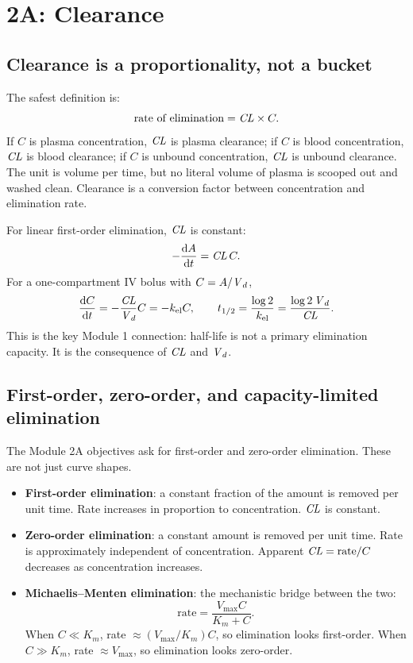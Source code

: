 \documentclass[a4paper]{article}
\newcommand{\CL}{\ensuremath{\pksym{CL}}}
\newcommand{\Vd}{\ensuremath{\pksym{V}_d}}
\newcommand{\kel}{\ensuremath{k_{\pklab{el}}}}
\newcommand{\Km}{\ensuremath{K_m}}
\newcommand{\Vmax}{\ensuremath{V_{\max}}}
\begin{document}
\section[2A: Renal and Hepatic Clearance]{2A: Clearance}

\subsection{Clearance is a proportionality, not a bucket}

The safest definition is:
\[
  \text{rate of elimination}
  =
  \CL \times C.
\]
If \(C\) is plasma concentration, \(\CL\) is plasma clearance; if \(C\) is blood concentration, \(\CL\) is blood clearance; if \(C\) is unbound concentration, \(\CL\) is unbound clearance. The unit is volume per time, but no literal volume of plasma is scooped out and washed clean. Clearance is a conversion factor between concentration and elimination rate.

For linear first-order elimination, \(\CL\) is constant:
\[
  -\frac{\dd A}{\dd t}
  =
  \CL\,C.
\]
For a one-compartment IV bolus with \(C=A/\Vd\),
\[
  \frac{\dd C}{\dd t}
  =
  -\frac{\CL}{\Vd}C
  =
  -\kel C,
  \qquad
  t_{1/2}=\frac{\log 2}{\kel}=\frac{\log 2\,\Vd}{\CL}.
\]
This is the key Module 1 connection: half-life is not a primary elimination capacity. It is the consequence of \CL{} and \Vd{}.

\subsection{First-order, zero-order, and capacity-limited elimination}

The Module 2A objectives ask for first-order and zero-order elimination. These are not just curve shapes.

\begin{itemize}[leftmargin=2em]
  \item \textbf{First-order elimination}: a constant fraction of the amount is removed per unit time. Rate increases in proportion to concentration. \(\CL\) is constant.
  \item \textbf{Zero-order elimination}: a constant amount is removed per unit time. Rate is approximately independent of concentration. Apparent \(\CL=\text{rate}/C\) decreases as concentration increases.
  \item \textbf{Michaelis--Menten elimination}: the mechanistic bridge between the two:
  \[
    \text{rate}
    =
    \frac{\Vmax C}{\Km+C}.
  \]
  When \(C\ll\Km\), rate \(\approx(\Vmax/\Km)C\), so elimination looks first-order. When \(C\gg\Km\), rate \(\approx\Vmax\), so elimination looks zero-order.
\end{itemize}
\end{document}
